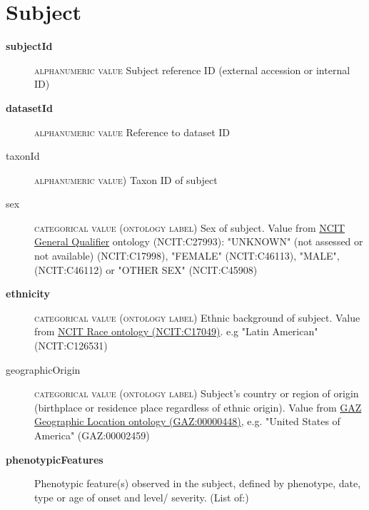 \documentclass[a4paper, 10pt]{article}        %
\begin{document}
\section*{{\color{teal} Subject}}
\begin{description}
	\item[\textbf{subjectId}]  {\textsc{alphanumeric value}} Subject reference ID (external accession or internal ID)
	\item[\textbf{datasetId}] {\textsc{alphanumeric value}} Reference to dataset ID 
	\item[taxonId] {\textsc{alphanumeric value)}} Taxon ID of subject
	\item[sex] {\textsc{categorical value (ontology label)}} Sex of subject. Value from \href{https://www.ebi.ac.uk/ols/ontologies/ncit/terms?iri=http%3A%2F%2Fpurl.obolibrary.org%2Fobo%2FNCIT_C27993&viewMode=All&siblings=false}{NCIT General Qualifier} ontology (NCIT:C27993): "UNKNOWN" (not assessed or not available) (NCIT:C17998), "FEMALE" (NCIT:C46113), "MALE", (NCIT:C46112) or "OTHER SEX" (NCIT:C45908)
	\item[\textbf{ethnicity}] {\textsc{categorical value (ontology label)}} Ethnic background of subject. Value from \href{https://www.ebi.ac.uk/ols/ontologies/ncit/terms?iri=http%3A%2F%2Fpurl.obolibrary.org%2Fobo%2FNCIT_C17049}{NCIT Race ontology (NCIT:C17049)}. e.g "Latin American" (NCIT:C126531)
	\item[geographicOrigin] {\textsc{categorical value (ontology label)}} Subject's country or region of origin (birthplace or residence place regardless of ethnic origin). Value from \href{https://www.ebi.ac.uk/ols/ontologies/gaz/terms?iri=http%3A%2F%2Fpurl.obolibrary.org%2Fobo%2FGAZ_00000448}{GAZ Geographic Location ontology (GAZ:00000448)}, e.g. "United States of America" (GAZ:00002459)
	\item[\textbf{phenotypicFeatures}] Phenotypic feature(s) observed in the subject, defined by phenotype, date, type or age of onset and level/ severity. (List of:)

\end{description}
\end{document}
